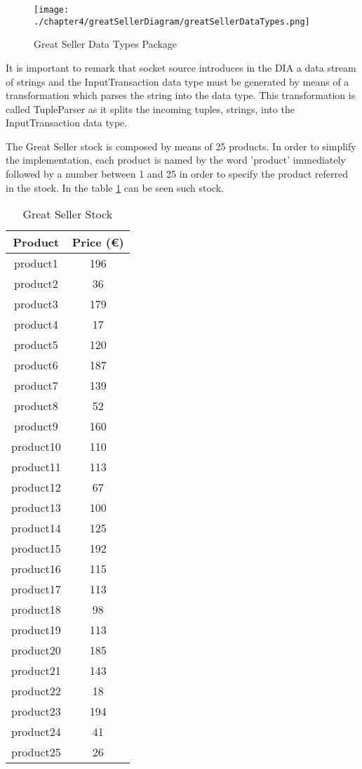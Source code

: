 \begin{figure}
\centering
{\texttt{[image: ./chapter4/greatSellerDiagram/greatSellerDataTypes.png]}}
\caption{Great Seller Data Types Package}
\label{fig:Great Seller Data Types Package}
\end{figure}

It is important to remark that socket source introduces in the DIA a data stream of strings and the InputTransaction data type must be generated by means of a transformation which parses the string into the data type. This transformation is called TupleParser as it splits the incoming tuples, strings, into the InputTransaction data type.

The Great Seller stock is composed by means of 25 products. In order to simplify the implementation, each product is named by the word 'product' immediately followed by a number between 1 and 25 in order to specify the product referred in the stock. In the table \ref{Great Seller Stock} can be seen such stock.

\begin{table}[h!]
\centering
	\begin{tabular}{||c|c||} 
	\hline\hline
	Product & Price (\euro{}) \\ [1ex] 
	\hline\hline
	product1 & 196 \\ 
	\hline
	product2 & 36 \\ 
	\hline
	product3 & 179 \\ 
	\hline
	product4 & 17 \\ 
	\hline
	product5 & 120 \\ 
	\hline
	product6 & 187 \\ 
	\hline
	product7 & 139 \\ 
	\hline
	product8 & 52 \\ 
	\hline
	product9 & 160 \\ 
	\hline
	product10 & 110 \\ 
	\hline
	product11 & 113 \\ 
	\hline
	product12 & 67 \\ 
	\hline
	product13 & 100 \\ 
	\hline
	product14 & 125 \\ 
	\hline
	product15 & 192 \\ 
	\hline
	product16 & 115 \\ 
	\hline
	product17 & 113 \\ 
	\hline
	product18 & 98 \\ 
	\hline
	product19 & 113 \\ 
	\hline
	product20 & 185 \\ 
	\hline
	product21 & 143 \\ 
	\hline
	product22 & 18 \\ 
	\hline
	product23 & 194 \\ 
	\hline
	product24 & 41 \\ 
	\hline
	product25 & 26 \\ 
	\hline\hline
	\end{tabular}
\caption{Great Seller Stock}
\label{Great Seller Stock}
\end{table}

